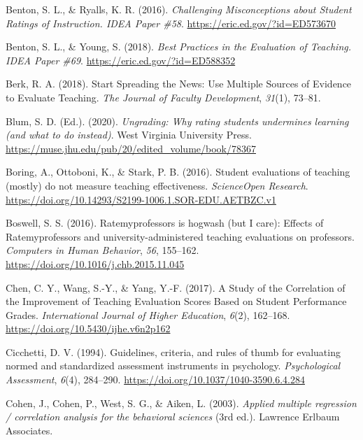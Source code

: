 \documentclass[
  man]{apa7}
\newlength{\cslhangindent}
\newlength{\cslentryspacingunit} %
\newenvironment{CSLReferences}[2] %
 {%
  \setlength{\parindent}{0pt}
  \ifodd #1
  \let\oldpar\par
  \def\par{\hangindent=\cslhangindent\oldpar}
  \fi
  \setlength{\parskip}{#2\cslentryspacingunit}
 }%
 {}
\begin{document}
\begin{CSLReferences}{1}{0}
\leavevmode{}%
Benton, S. L., \& Ryalls, K. R. (2016). \emph{Challenging Misconceptions about Student Ratings of Instruction. IDEA Paper {\#}58}. \url{https://eric.ed.gov/?id=ED573670}

\leavevmode{}%
Benton, S. L., \& Young, S. (2018). \emph{Best Practices in the Evaluation of Teaching. IDEA Paper {\#}69}. \url{https://eric.ed.gov/?id=ED588352}

\leavevmode{}%
Berk, R. A. (2018). Start Spreading the News: Use Multiple Sources of Evidence to Evaluate Teaching. \emph{The Journal of Faculty Development}, \emph{31}(1), 73--81.

\leavevmode{}%
Blum, S. D. (Ed.). (2020). \emph{Ungrading: Why rating students undermines learning (and what to do instead)}. West Virginia University Press. \url{https://muse.jhu.edu/pub/20/edited_volume/book/78367}

\leavevmode{}%
Boring, A., Ottoboni, K., \& Stark, P. B. (2016). Student evaluations of teaching (mostly) do not measure teaching effectiveness. \emph{ScienceOpen Research}. \url{https://doi.org/10.14293/S2199-1006.1.SOR-EDU.AETBZC.v1}

\leavevmode{}%
Boswell, S. S. (2016). Ratemyprofessors is hogwash (but I care): Effects of Ratemyprofessors and university-administered teaching evaluations on professors. \emph{Computers in Human Behavior}, \emph{56}, 155--162. \url{https://doi.org/10.1016/j.chb.2015.11.045}

\leavevmode{}%
Chen, C. Y., Wang, S.-Y., \& Yang, Y.-F. (2017). A Study of the Correlation of the Improvement of Teaching Evaluation Scores Based on Student Performance Grades. \emph{International Journal of Higher Education}, \emph{6}(2), 162--168. \url{https://doi.org/10.5430/ijhe.v6n2p162}

\leavevmode{}%
Cicchetti, D. V. (1994). Guidelines, criteria, and rules of thumb for evaluating normed and standardized assessment instruments in psychology. \emph{Psychological Assessment}, \emph{6}(4), 284--290. \url{https://doi.org/10.1037/1040-3590.6.4.284}

\leavevmode{}%
Cohen, J., Cohen, P., West, S. G., \& Aiken, L. (2003). \emph{Applied multiple regression / correlation analysis for the behavioral sciences} (3rd ed.). Lawrence Erlbaum Associates.


\end{CSLReferences}
\end{document}
